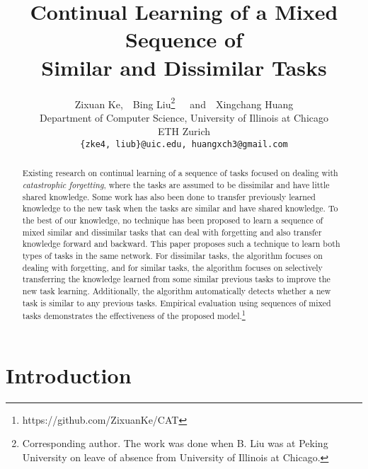 \documentclass{article}
\title{Continual Learning of a Mixed Sequence of \\ Similar and Dissimilar Tasks}
\author{
  Zixuan Ke,~~Bing Liu\thanks{Corresponding author. The work was done when B. Liu was at Peking University on leave of absence from University of Illinois at Chicago.}~~~and~~Xingchang Huang \\
   Department of Computer Science, University of Illinois at Chicago \\
   ETH Zurich \\
\texttt{\{zke4,~liub\}@uic.edu, huangxch3@gmail.com}
}
\begin{document}
\maketitle

\begin{abstract}
Existing research on continual learning of a sequence of tasks focused on dealing with \textit{catastrophic forgetting}, where the tasks are assumed to be dissimilar and have little shared knowledge. Some work has also been done to transfer previously learned knowledge to the new task when the tasks are similar and have shared knowledge. To the best of our knowledge, no technique has been proposed to learn a sequence of mixed similar and dissimilar tasks that can deal with forgetting and also transfer knowledge forward and backward. This paper proposes such a technique to learn both types of tasks in the same network. For dissimilar tasks, the algorithm focuses on dealing with forgetting, and for similar tasks, the algorithm focuses on selectively transferring the knowledge learned from some similar previous tasks to improve the new task learning. Additionally, the algorithm automatically detects whether a new task is similar to any previous tasks. Empirical evaluation using sequences of mixed tasks demonstrates the effectiveness of the proposed model.\footnote{https://github.com/ZixuanKe/CAT} 







\end{abstract}


\maketitle

\section{Introduction}
\label{sec:introduction}
\end{document}
